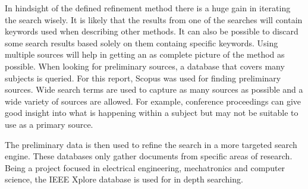 In hindsight of the defined refinement method
there is a huge gain in iterating the search wisely. It is likely that the
results from one of the searches will contain keywords used when describing
other methods. It can also be possible to discard some search results based
solely on them containg specific keywords. Using multiple sources will help in
getting an as complete picture of the method as possible. When looking for
preliminary sources, a database that covers many subjects is queried. For this
report, Scopus was used for finding preliminary sources. Wide search terms are
used to capture as many sources as possible and a wide variety of sources are
allowed. For example, conference proceedings can give good insight into what is
happening within a subject but may not be suitable to use as a primary source. 

The preliminary data is then used to refine the search in a more targeted search
engine. These databases only gather documents from specific areas of research.
Being a project focused in electrical engineering, mechatronics and computer
science, the IEEE Xplore database is used for in depth searching.  

